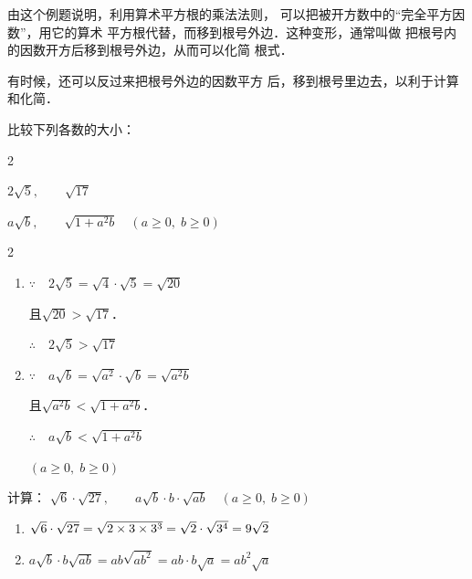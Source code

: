 由这个例题说明，利用算术平方根的乘法法则，
可以把被开方数中的“完全平方因数”，用它的算术
平方根代替，而移到根号外边．这种变形，通常叫做
把根号内的因数开方后移到根号外边，从而可以化简
根式．

有时候，还可以反过来把根号外边的因数平方
后，移到根号里边去，以利于计算和化简．
    
\begin{example}
    比较下列各数的大小：
\begin{enumerate}
    \begin{multicols}{2}
      
    \item $2\sqrt{5},\qquad \sqrt{17}$
   \item $a\sqrt{b},\qquad \sqrt{1+a^2b}\quad  (a\ge0,\; b\ge0)$  
    \end{multicols}
\end{enumerate}
\end{example}

\begin{solution}
    \begin{multicols}{2}
        \begin{enumerate}
    \item $\because\quad 2\sqrt{5}=\sqrt{4}\cdot \sqrt{5}=\sqrt{20}$
    
    且$\sqrt{20}>\sqrt{17}$．
   
   $\therefore\quad  2\sqrt{5}>\sqrt{17}$

    \item $\because\quad a\sqrt{b}=\sqrt{a^2}\cdot \sqrt{b}=\sqrt{a^2b}$
    
    且$\sqrt{a^2b}<\sqrt{1+a^2b}$．

   $\therefore\quad  a\sqrt{b}<\sqrt{1+a^2b}$
   
   $(a\ge 0,\; b\ge 0)$
\end{enumerate}  
    \end{multicols}
  
\end{solution}

\begin{example}
    计算：
$\sqrt{6}\cdot \sqrt{27},\qquad a\sqrt{b}\cdot b\cdot \sqrt{ab}\quad  (a\ge0,\; b\ge0)$
\end{example}

\begin{solution}
\begin{enumerate}
    \item $\sqrt{6}\cdot \sqrt{27}=\sqrt{2\times3\times3^3}=\sqrt{2}\cdot \sqrt{3^4}=9\sqrt{2}$
    \item $a\sqrt{b}\cdot b \sqrt{ab}=ab\sqrt{ab^2}=ab\cdot b\sqrt{a}=ab^2\sqrt{a}$
\end{enumerate}
\end{solution}

